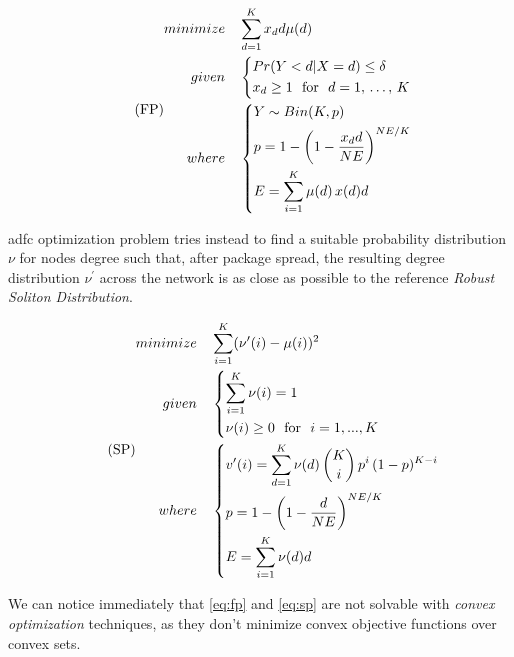 \documentclass[12pt,journal,draftclsnofoot,onecolumn]{IEEEtran}
\begin{document}
\begin{equation}
	\label{eq:fp}
	\tag{FP}
	\begin{split}
		minimize \quad & \sum_{d=1}^K x_d d \mu (d) \\
		given \quad & \begin{dcases}
			Pr(Y<d|X=d) \leq \delta \\
			x_d \geq 1 \text{ ~for~ } d = 1, \, \ldots, \, K
		\end{dcases} \\
		where \quad & \begin{dcases}
			Y \sim Bin(K, p) \\
			p = 1 - \left( 1 - \frac{x_d d}{NE} \right) ^ {NE / K} \\
			E = \sum_{i = 1}^{K} \mu(d) \, x(d) d
		\end{dcases} \\
	\end{split}
\end{equation}

\bigbreak

\gls{adfc} optimization problem tries instead to find a suitable probability distribution $\nu$ for nodes degree such that, after package spread, the resulting degree distribution $\nu^\prime$ across the network is as close as possible to the reference \emph{Robust Soliton Distribution}.

\begin{equation}
	\label{eq:sp}
	\tag{SP}
	\begin{split}
		minimize & \quad \sum_{i=1}^{K}(\nu'(i)-\mu(i))^2 \\
		given & \quad \begin{dcases}
			\sum_{i=1}^K \nu(i) = 1 \\
			\nu(i) \geq 0 \text{~~for~~} i=1,...,K
		\end{dcases} \\
		where & \quad
		\begin{dcases}
			v^\prime(i) = \sum_{d=1}^K \nu(d) \,\binom{K}{i} \, p^i \, (1-p)^{K-i} \\
			p = 1 - \left(1 -\frac{d}{N E}\right)^{{N E} / {K}} \\
			E = \sum_{i = 1}^{K} \nu(d) d
		\end{dcases}
	\end{split}
\end{equation} \vspace{0cm}

We can notice immediately that \autoref{eq:fp} and \autoref{eq:sp} are not solvable with \emph{convex optimization} techniques, as they don't minimize convex objective functions over convex sets.
\end{document}
